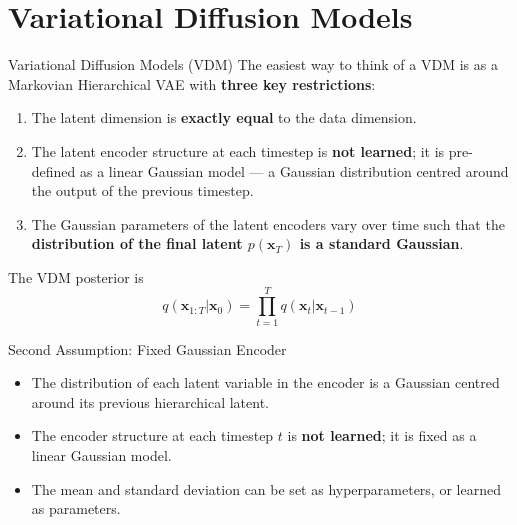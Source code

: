 \documentclass[aspectratio=169,10pt]{beamer}
\newcommand{\bx}{\bm{x}}
\begin{document}
\section{Variational Diffusion Models}

\begin{frame}{Variational Diffusion Models (VDM)}
  The easiest way to think of a VDM is as a Markovian Hierarchical VAE
  with \textbf{three key restrictions}:
  \begin{enumerate}
    \item The latent dimension is \textbf{exactly equal} to the data dimension.
    \item The latent encoder structure at each timestep is \textbf{not learned};
          it is pre-defined as a linear Gaussian model — a Gaussian distribution
          centred around the output of the previous timestep.
    \item The Gaussian parameters of the latent encoders vary over time
          such that the \textbf{distribution of the final latent $p(\bx_T)$
          is a standard Gaussian}.
  \end{enumerate}
  \vspace{6pt}
  The VDM posterior is
  \[
    q(\bx_{1:T}|\bx_0) = \prod_{t=1}^{T} q(\bx_t|\bx_{t-1})
  \]
\end{frame}

\begin{frame}{Second Assumption: Fixed Gaussian Encoder}
  \begin{itemize}
    \item The distribution of each latent variable in the encoder is a
          Gaussian centred around its previous hierarchical latent.
    \item The encoder structure at each timestep $t$ is \textbf{not learned};
          it is fixed as a linear Gaussian model.
    \item The mean and standard deviation can be set as hyperparameters,
          or learned as parameters.
  \end{itemize}
\end{frame}
\end{document}
